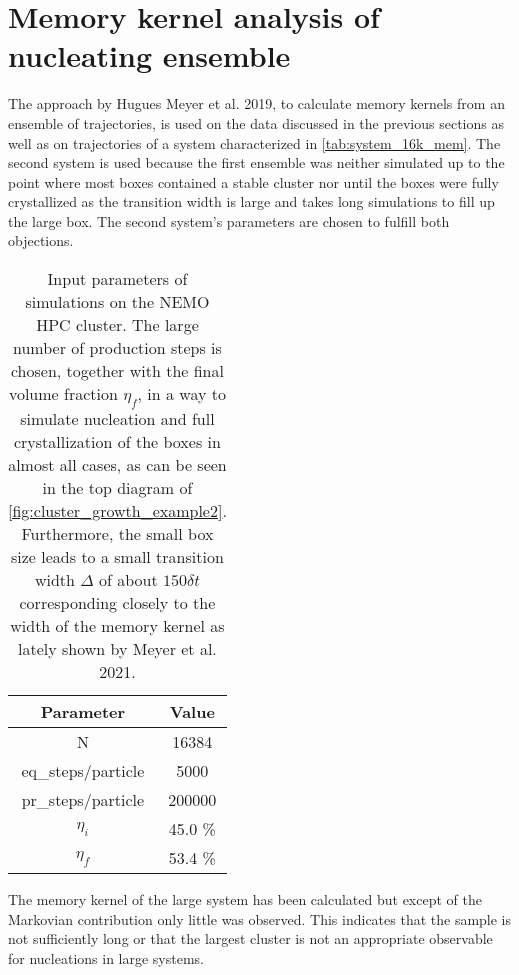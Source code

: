 \section{Memory kernel analysis of nucleating ensemble}
\label{sec:memory_kernels}
The approach by Hugues Meyer et al. 2019\cite{Meyer2019a}, to calculate memory kernels from an ensemble of trajectories, is used on the data discussed in the previous sections as well as on trajectories of a system characterized in \autoref{tab:system_16k_mem}. The second system is used because the first ensemble was neither simulated up to the point where most boxes contained a stable cluster nor until the boxes were fully crystallized as the transition width is large and takes long simulations to fill up the large box. The second system's parameters are chosen to fulfill both objections.\\

\begin{table}[ht]
\centering
\begin{tabular}{c|c}
Parameter & Value \\ \hline
N & 16384 \\
eq\_steps/particle & 5000 \\
pr\_steps/particle & 200000 \\
$\eta_i$ & 45.0 \% \\
$\eta_f$ & 53.4 \% \\
\end{tabular}
\caption[Simulation parameters of data production system with 16384 particles]{Input parameters of simulations on the NEMO HPC cluster. The large number of production steps is chosen, together with the final volume fraction $\eta_f$, in a way to simulate nucleation and full crystallization of the boxes in almost all cases, as can be seen in the top diagram of \autoref{fig:cluster_growth_example2}. Furthermore, the small box size leads to a small transition width $\Delta$ of about $150 \delta t$ corresponding closely to the width of the memory kernel as lately shown by Meyer et al. 2021\cite{Meyer2021}.} 
\label{tab:system_16k_mem}
\end{table}

The memory kernel of the large system has been calculated but except of the Markovian contribution only little was observed. This indicates that the sample is not sufficiently long or that the largest cluster is not an appropriate observable for nucleations in large systems.\\

